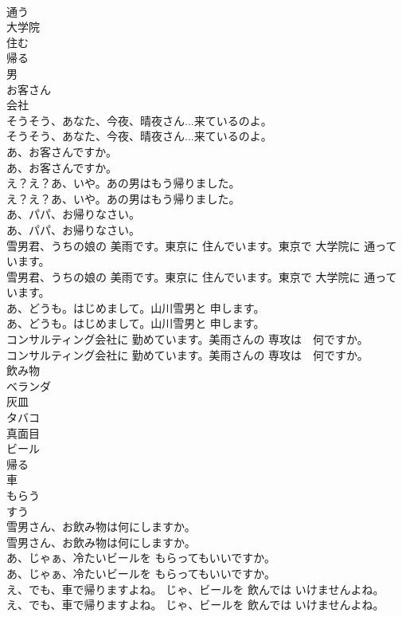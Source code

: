 \documentclass[8pt]{extreport}
\begin{document}
\begin{CJK}{UTF8}{min}
\\	通う
\\	大学院
\\	住む
\\	帰る
\\	男
\\	お客さん
\\	会社
\\	そうそう、あなた、今夜、晴夜さん...来ているのよ。	
\\	そうそう、あなた、今夜、晴夜さん...来ているのよ。 
\\	あ、お客さんですか。	
\\	あ、お客さんですか。 
\\	え？え？あ、いや。あの男はもう帰りました。	
\\	え？え？あ、いや。あの男はもう帰りました。 
\\	あ、パパ、お帰りなさい。	
\\	あ、パパ、お帰りなさい。 
\\	雪男君、うちの娘の 美雨です。東京に 住んでいます。東京で 大学院に 通っています。	
\\	雪男君、うちの娘の 美雨です。東京に 住んでいます。東京で 大学院に 通っています。 
\\	あ、どうも。はじめまして。山川雪男と 申します。	
\\	あ、どうも。はじめまして。山川雪男と 申します。 
\\	コンサルティング会社に 勤めています。美雨さんの 専攻は　何ですか。	
\\	コンサルティング会社に 勤めています。美雨さんの 専攻は　何ですか。 
\\	飲み物
\\	ベランダ
\\	灰皿
\\	タバコ
\\	真面目
\\	ビール
\\	帰る
\\	車
\\	もらう
\\	すう
\\	雪男さん、お飲み物は何にしますか。	
\\	雪男さん、お飲み物は何にしますか。 
\\	あ、じゃぁ、冷たいビールを もらってもいいですか。	
\\	あ、じゃぁ、冷たいビールを もらってもいいですか。 
\\	え、でも、車で帰りますよね。 じゃ、ビールを 飲んでは いけませんよね。	
\\	え、でも、車で帰りますよね。 じゃ、ビールを 飲んでは いけませんよね。 

\end{CJK}
\end{document}
